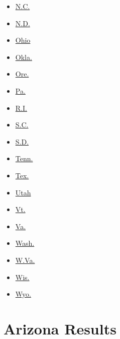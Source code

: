 \begin{itemize}
\tightlist
\item
  \href{//www.nytimes3xbfgragh.onion/elections/2016/results/north-carolina}{N.C.}
\item
  \href{//www.nytimes3xbfgragh.onion/elections/2016/results/north-dakota}{N.D.}
\item
  \href{//www.nytimes3xbfgragh.onion/elections/2016/results/ohio}{Ohio}
\item
  \href{//www.nytimes3xbfgragh.onion/elections/2016/results/oklahoma}{Okla.}
\item
  \href{//www.nytimes3xbfgragh.onion/elections/2016/results/oregon}{Ore.}
\item
  \href{//www.nytimes3xbfgragh.onion/elections/2016/results/pennsylvania}{Pa.}
\item
  \href{//www.nytimes3xbfgragh.onion/elections/2016/results/rhode-island}{R.I.}
\item
  \href{//www.nytimes3xbfgragh.onion/elections/2016/results/south-carolina}{S.C.}
\item
  \href{//www.nytimes3xbfgragh.onion/elections/2016/results/south-dakota}{S.D.}
\item
  \href{//www.nytimes3xbfgragh.onion/elections/2016/results/tennessee}{Tenn.}
\item
  \href{//www.nytimes3xbfgragh.onion/elections/2016/results/texas}{Tex.}
\end{itemize}

\begin{itemize}
\tightlist
\item
  \href{//www.nytimes3xbfgragh.onion/elections/2016/results/utah}{Utah}
\item
  \href{//www.nytimes3xbfgragh.onion/elections/2016/results/vermont}{Vt.}
\item
  \href{//www.nytimes3xbfgragh.onion/elections/2016/results/virginia}{Va.}
\item
  \href{//www.nytimes3xbfgragh.onion/elections/2016/results/washington}{Wash.}
\item
  \href{//www.nytimes3xbfgragh.onion/elections/2016/results/west-virginia}{W.Va.}
\item
  \href{//www.nytimes3xbfgragh.onion/elections/2016/results/wisconsin}{Wis.}
\item
  \href{//www.nytimes3xbfgragh.onion/elections/2016/results/wyoming}{Wyo.}
\end{itemize}

\hypertarget{arizona-results}{%
\section{Arizona Results}\label{arizona-results}}


